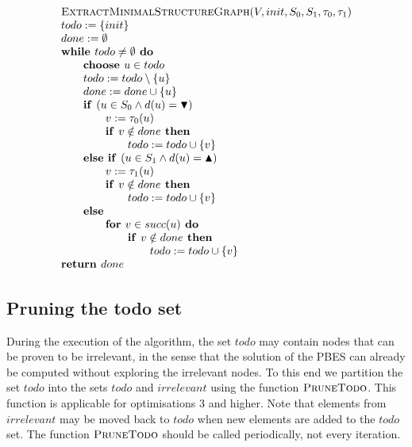 \documentclass{article}
\newcommand{\If}{\text{\textbf{if }}}
\newcommand{\Do}{\text{\textbf{ do }}}
\newcommand{\Then}{\text{\textbf{ then }}}
\newcommand{\Else}{\text{\textbf{else }}}
\newcommand{\For}{\text{\textbf{for }}}
\newcommand{\While}{\text{\textbf{while }}}
\newcommand{\Choose}{\text{\textbf{choose }}}
\newcommand{\Return}{\text{\textbf{return }}}
\begin{document}
\begin{equation*}
\begin{array}{l}
\textsc{ExtractMinimalStructureGraph}(V,init,S_0,S_1,\tau_0,\tau_1)\\
todo := \{ init \} \\
done := \emptyset \\
\While todo \neq \emptyset \Do \\
\qquad \Choose u \in todo \\
\qquad todo := todo \setminus \{ u \} \\
\qquad done := done \cup \{ u \} \\
\qquad \If (u \in S_0 \land d(u) = \blacktriangledown) \\
\qquad \qquad v := \tau_0(u) \\
\qquad \qquad \If v \notin done \Then \\
\qquad \qquad \qquad todo := todo \cup \{ v \} \\
\qquad \Else \If (u \in S_1 \land d(u) = \blacktriangle) \\
\qquad \qquad v := \tau_1(u) \\
\qquad \qquad \If v \notin done \Then \\
\qquad \qquad \qquad todo := todo \cup \{ v \} \\
\qquad \Else \\
\qquad \qquad \For v \in succ(u) \Do \\
\qquad \qquad \qquad \If v \notin done \Then \\
\qquad \qquad \qquad \qquad todo := todo \cup \{ v \} \\
\Return done
\end{array}
\end{equation*}

\subsection{Pruning the todo set}

During the execution of the algorithm, the set $todo$ may contain nodes that can be proven to
be irrelevant, in the sense that the solution of the PBES can already be computed without exploring the irrelevant nodes. To this end we partition the set $todo$ into the sets $todo$ and $irrelevant$ using the function $\textsc{PruneTodo}$. This function is applicable for optimisations 3 and higher. Note that elements from $irrelevant$ may be moved back to $todo$ when new elements are added to the $todo$ set.
The function $\textsc{PruneTodo}$ should be called periodically, not every iteration.
\end{document}
